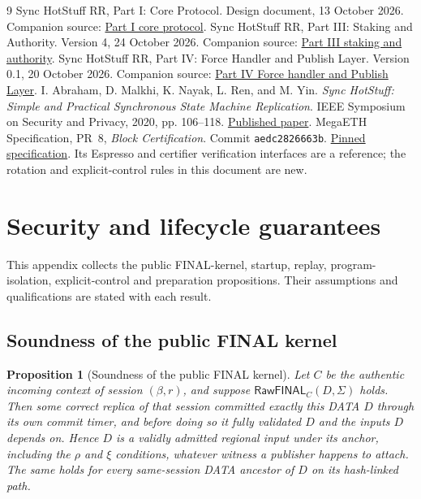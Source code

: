 \documentclass[11pt,a4paper]{article}
\newcommand{\tagg}[1]{\ensuremath{\mathsf{#1}}}
\newtheorem{proposition}[proposition]{Proposition}
\newcounter{protocol}
\begin{document}
\begingroup\small
\begin{thebibliography}{9}
Sync HotStuff RR, Part I: Core Protocol. Design document, 13 October 2026.
Companion source: \href{run:sync_hotstuff_rr_part1_core.tex}{Part I core protocol}.
Sync HotStuff RR, Part III: Staking and Authority. Version 4, 24 October 2026.
Companion source: \href{run:sync_hotstuff_rr_part3_staking_v4.tex}{Part III staking and authority}.
Sync HotStuff RR, Part IV: Force Handler and Publish Layer.
Version 0.1, 20 October 2026.
Companion source: \href{run:sync_hotstuff_rr_part4_force_v0_1.tex}{Part IV Force handler and Publish Layer}.
I. Abraham, D. Malkhi, K. Nayak, L. Ren, and M. Yin.
\emph{Sync HotStuff: Simple and Practical Synchronous State Machine Replication}.
IEEE Symposium on Security and Privacy, 2020, pp. 106--118.
\href{https://conferences.computer.org/sp/pdfs/sp/2020/349700a106.pdf}{Published paper}.
MegaETH Specification, PR~8, \emph{Block Certification}.
Commit \texttt{aedc2826663b}.
\href{https://github.com/megaeth-labs/specification/tree/aedc2826663b134ee25d26bea17e70c6d23d321c/specs/block-certification}{Pinned specification}.
Its Espresso and certifier verification interfaces are a reference;
the rotation and explicit-control rules in this document are new.
\end{thebibliography}
\endgroup
\appendix
{}
\section{Security and lifecycle guarantees}
\label{app:security}
This appendix collects the public FINAL-kernel, startup, replay,
program-isolation, explicit-control and preparation propositions.
Their assumptions and qualifications are stated with each result.

\subsection{Soundness of the public FINAL kernel}
\label{app:final-kernel-proof}
\begin{proposition}[Soundness of the public FINAL kernel]
\label{prop:final-kernel-soundness}
Let $C$ be the authentic incoming context of session $(\beta,r)$, and
suppose $\tagg{RawFINAL}_C(D,\Sigma)$ holds. Then some correct replica of
that session committed exactly this DATA $D$ through its own commit
timer, and before doing so it fully validated $D$ and the inputs $D$
depends on. Hence $D$ is a validly admitted regional input under its
anchor, including the $\rho$ and $\xi$ conditions, whatever witness a
publisher happens to attach. The same holds for every same-session DATA
ancestor of $D$ on its hash-linked path.
\end{proposition}
\end{document}
